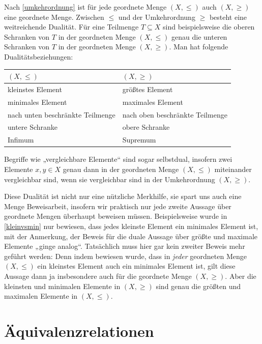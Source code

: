 \begin{bem} \label{ordnungsdualitaet} 
    Nach \cref{umkehrordnung} ist für jede geordnete Menge $(X,\le)$ auch $(X,\ge)$ eine geordnete Menge. Zwischen $\le$ und der Umkehrordnung $\ge$ besteht eine weitreichende Dualität. Für eine Teilmenge $T\subseteq X$ sind beispielsweise die oberen Schranken von $T$ in der geordneten Menge $(X,\le)$ genau die unteren Schranken von $T$ in der geordneten Menge $(X,\ge)$. Man hat folgende Dualitätsbeziehungen:
    \begin{center}
    \begin{tabular}{ll}
        $(X,\le)$ & $(X,\ge)$ \\
        \midrule
        kleinstes Element & größtes Element \\
        minimales Element & maximales Element \\
        nach unten beschränkte Teilmenge & nach oben beschränkte Teilmenge \\
        untere Schranke & obere Schranke \\
        Infimum & Supremum
    \end{tabular}
    \end{center}
    Begriffe wie „vergleichbare Elemente“ sind sogar selbstdual, insofern zwei Elemente $x,y\in X$ genau dann in der geordneten Menge $(X,\le)$ miteinander vergleichbar sind, wenn sie vergleichbar sind in der Umkehrordnung $(X,\ge)$.

    Diese Dualität ist nicht nur eine nützliche Merkhilfe, sie spart uns auch eine Menge Beweisarbeit, insofern wir praktisch nur jede zweite Aussage über geordnete Mengen überhaupt beweisen müssen. Beispielsweise wurde in \cref{kleinvsmin} nur bewiesen, dass jedes kleinste Element ein minimales Element ist, mit der Anmerkung, der Beweis für die duale Aussage über größte und maximale Elemente „ginge analog“. Tatsächlich muss hier gar kein zweiter Beweis mehr geführt werden: Denn indem bewiesen wurde, dass in \emph{jeder} geordneten Menge $(X,\le)$ ein kleinstes Element auch ein minimales Element ist, gilt diese Aussage dann ja insbesondere auch für die geordnete Menge $(X,\ge)$. Aber die kleinsten und minimalen Elemente in $(X,\ge)$ sind genau die größten und maximalen Elemente in $(X,\le)$.
\end{bem}





\section{Äquivalenzrelationen} \label{sec:aequirel}



